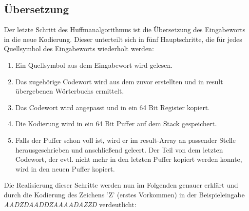 \documentclass[course=erap]{aspdoc}
\begin{document}
\subsection{Übersetzung}
Der letzte Schritt des Huffmanalgorithmus ist die Übersetzung des Eingabeworts in die neue Kodierung. Dieser unterteilt sich in fünf Hauptschritte, die für jedes Quellsymbol des Eingabeworts wiederholt werden: 
\begin{enumerate}
	\item Ein Quellsymbol aus dem Eingabewort wird gelesen.
	
	\item Das zugehörige Codewort wird aus dem zuvor erstellten und in result übergebenen Wörterbuchs ermittelt.
	
	\item Das Codewort wird angepasst und in ein 64 Bit Register kopiert.
	
	\item Die Kodierung wird in ein 64 Bit Puffer auf dem Stack gespeichert. 
	
	\item Falls der Puffer schon voll ist, wird er im result-Array an passender Stelle herausgeschrieben und anschließend geleert. Der Teil von dem letzten Codewort, der evtl. nicht mehr in den letzten Puffer kopiert werden konnte, wird in den neuen Puffer kopiert.
	
	 
\end{enumerate}
Die Realisierung dieser Schritte werden nun im Folgenden genauer erklärt und durch die Kodierung des Zeichens 'Z' (erstes Vorkommen) in der Beispieleingabe \\ \textit{AADZDAADDZAAAADAZZD} verdeutlicht: 
\end{document}
